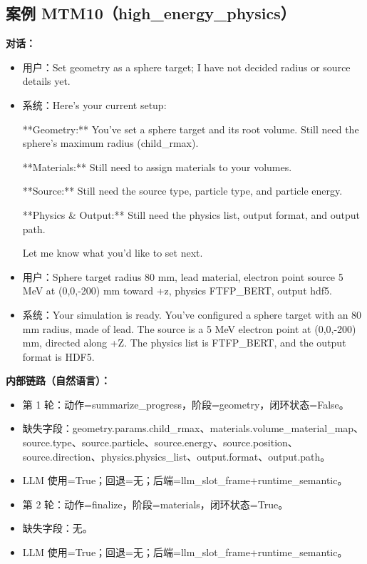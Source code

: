\documentclass[11pt]{ctexart}
\begin{document}
\subsection{案例 MTM10（high\_energy\_physics）}
\textbf{对话：}
\begin{itemize}
\item 用户：Set geometry as a sphere target; I have not decided radius or source details yet.
\item 系统：Here's your current setup:

**Geometry:** You've set a sphere target and its root volume. Still need the sphere's maximum radius (child\_rmax).

**Materials:** Still need to assign materials to your volumes.

**Source:** Still need the source type, particle type, and particle energy.

**Physics \& Output:** Still need the physics list, output format, and output path.

Let me know what you'd like to set next.
\item 用户：Sphere target radius 80 mm, lead material, electron point source 5 MeV at (0,0,-200) mm toward +z, physics FTFP\_BERT, output hdf5.
\item 系统：Your simulation is ready. You've configured a sphere target with an 80 mm radius, made of lead. The source is a 5 MeV electron point at (0,0,-200) mm, directed along +Z. The physics list is FTFP\_BERT, and the output format is HDF5.
\end{itemize}
\textbf{内部链路（自然语言）：}
\begin{itemize}
\item 第 1 轮：动作=summarize\_progress，阶段=geometry，闭环状态=False。
\item 缺失字段：geometry.params.child\_rmax、materials.volume\_material\_map、source.type、source.particle、source.energy、source.position、source.direction、physics.physics\_list、output.format、output.path。
\item LLM 使用=True；回退=无；后端=llm\_slot\_frame+runtime\_semantic。
\item 第 2 轮：动作=finalize，阶段=materials，闭环状态=True。
\item 缺失字段：无。
\item LLM 使用=True；回退=无；后端=llm\_slot\_frame+runtime\_semantic。
\end{itemize}
\end{document}
